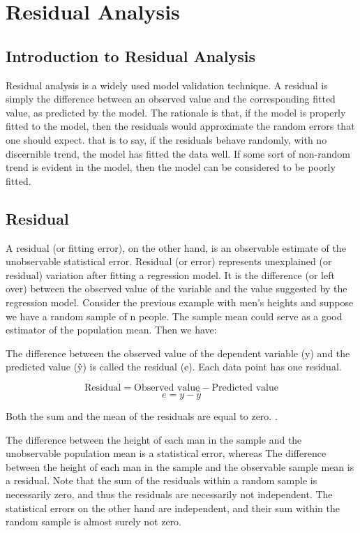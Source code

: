 \documentclass[Main.tex]{subfiles}
\begin{document}
\chapter{Residual Analysis}
\section{Introduction to Residual Analysis}
Residual analysis is a widely used model validation technique. A residual is simply the difference between an observed value and the corresponding fitted value, as predicted by the model. The rationale is that, if the model is properly fitted to the model, then the residuals would approximate the random errors that one should expect.
that is to say, if the residuals behave randomly, with no discernible trend, the model has fitted the data well. If some sort of non-random trend is evident in the model, then the model can be considered to be poorly fitted.

\section{Residual}

A residual (or fitting error), on the other hand, is an observable estimate of the unobservable statistical error.
Residual (or error) represents unexplained (or residual) variation after fitting a regression model. It is the difference (or left over) between the observed value of the variable and the value suggested by the regression model.
Consider the previous example with men's heights and suppose we have a random sample of n people. The sample mean could serve as a good estimator of the population mean. Then we have:


The difference between the observed value of the dependent variable (y) and the predicted value (ŷ) is called the residual (e). Each data point has one residual.

\[ \mbox{Residual} = \mbox{Observed value} - \mbox{Predicted value}\]
\[e = y - \hat{y} \]

Both the sum and the mean of the residuals are equal to zero. .



The difference between the height of each man in the sample and the unobservable population mean is a statistical error, whereas
The difference between the height of each man in the sample and the observable sample mean is a residual.
Note that the sum of the residuals within a random sample is necessarily zero, and thus the residuals are necessarily not independent. The statistical errors on the other hand are independent, and their sum within the random sample is almost surely not zero.
\end{document}
